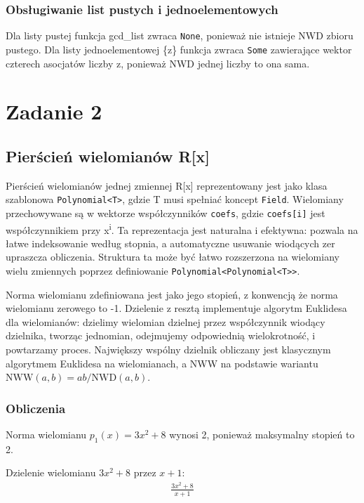 \documentclass{article}
\begin{document}
\subsubsection*{Obsługiwanie list pustych i jednoelementowych}

Dla listy pustej funkcja gcd\_list zwraca \texttt{None}, ponieważ nie istnieje NWD zbioru pustego. Dla listy jednoelementowej \{z\} funkcja zwraca \texttt{Some} zawierające wektor czterech asocjatów liczby z, ponieważ NWD jednej liczby to ona sama.

\clearpage

\section*{Zadanie 2}

\subsection*{Pierścień wielomianów R[x]}

Pierścień wielomianów jednej zmiennej R[x] reprezentowany jest jako klasa szablonowa \texttt{Polynomial<T>}, gdzie T musi spełniać koncept \texttt{Field}. Wielomiany przechowywane są w wektorze współczynników \texttt{coefs}, gdzie \texttt{coefs[i]} jest współczynnikiem przy x\textsuperscript{i}. Ta reprezentacja jest naturalna i efektywna: pozwala na łatwe indeksowanie według stopnia, a automatyczne usuwanie wiodących zer upraszcza obliczenia. Struktura ta może być łatwo rozszerzona na wielomiany wielu zmiennych poprzez definiowanie \texttt{Polynomial<Polynomial<T>>}.

Norma wielomianu zdefiniowana jest jako jego stopień, z konwencją że norma wielomianu zerowego to -1. Dzielenie z resztą implementuje algorytm Euklidesa dla wielomianów: dzielimy wielomian dzielnej przez współczynnik wiodący dzielnika, tworząc jednomian, odejmujemy odpowiednią wielokrotność, i powtarzamy proces. Największy wspólny dzielnik obliczany jest klasycznym algorytmem Euklidesa na wielomianach, a NWW na podstawie wariantu \(\text{NWW}(a,b) = ab / \text{NWD}(a,b)\).

\subsubsection*{Obliczenia}

Norma wielomianu \(p_1(x) = 3x^2 + 8\) wynosi 2, ponieważ maksymalny stopień to 2.

Dzielenie wielomianu \(3x^2 + 8\) przez \(x + 1\):
\begin{align*}
\frac{3x^2 + 8}{x + 1}
\end{align*}
\end{document}
